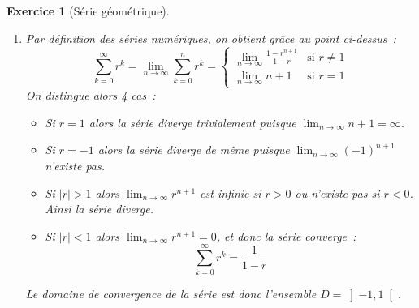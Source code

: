 \documentclass[11.5pt,french,table]{article}
\theoremstyle{exercice}
\newtheorem{exercice}{Exercice}
\begin{document}
\begin{exercice}[Série géométrique]
\begin{enumerate}
    \item Par définition des séries numériques, on obtient grâce au point ci-dessus~:
    \[
    \sum_{k = 0}^{\infty} r^k = \lim_{n \to \infty} \sum_{k = 0}^{n} r^k = \begin{cases}
    \displaystyle\lim_{n \to \infty} \frac{1 - r^{n+1}}{1-r} & \textrm{si } r \neq 1 \\
    \displaystyle\lim_{n \to \infty} n + 1 & \textrm{si } r = 1
    \end{cases}
    \]
    On distingue alors 4 cas~:
    \begin{itemize}
        \item Si $r = 1$ alors la série diverge trivialement puisque $\displaystyle\lim_{n \to \infty} n + 1 = \infty$.
        \item Si $r = -1$ alors la série diverge de même puisque $\displaystyle\lim_{n \to \infty} (-1)^{n+1}$ n'existe pas.
        \item Si $|r| > 1$ alors $\displaystyle\lim_{n \to \infty} r^{n+1}$ est infinie si $r > 0$ ou n'existe pas si $r < 0$. Ainsi \emph{la série diverge}.
        \item Si $|r| < 1$ alors $\displaystyle\lim_{n \to \infty} r^{n+1} = 0$, et donc la série converge~:
        \[
        \sum_{k = 0}^{\infty} r^k = \frac{1}{1-r}
        \]
    \end{itemize}
    Le domaine de convergence de la série est donc l'ensemble $D = \left ] -1, 1 \right [$.
\end{enumerate}
\end{exercice}
\end{document}
